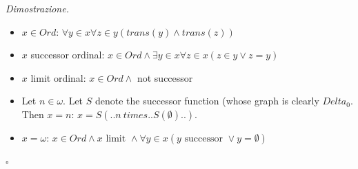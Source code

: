 \documentclass[a4paper,12pt]{article}
\newenvironment{proof}
  {\par\vspace{0.5em}\noindent\textit{Dimostrazione.} }
  {\par\vspace{1em}\hfill$\square$}
\begin{document}
\begin{proof}
\begin{itemize}
		\item	$x \in Ord$: $\forall y \in x \forall z \in y (trans(y) \land trans(z))$
		\item	$x$ successor ordinal: $x \in Ord \land \exists y \in x \forall z \in x (z \in y \lor z = y)$
		\item	$x$ limit ordinal: $x \in Ord \land$ not successor
		\item	Let $n \in \omega$. Let $S$ denote the successor function (whose graph is clearly $Delta_0$. Then $x = n$: $x = S(.. n \ times .. S(\emptyset)..)$.
		\item	$x = \omega$: $x \in Ord \land x \text{ limit } \land \forall y \in x (y \text{ successor } \lor y = \emptyset)$
	\end{itemize}
\end{proof}
\end{document}

